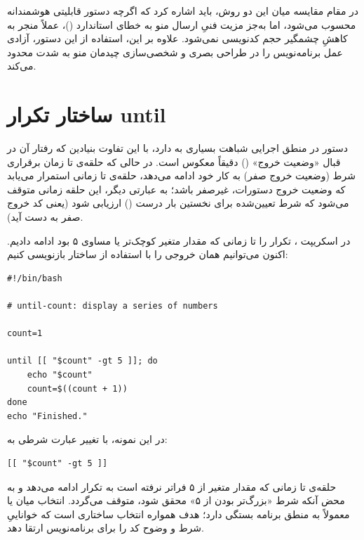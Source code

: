 در مقام مقایسه میان این دو روش، باید اشاره کرد که اگرچه دستور  قابلیتی هوشمندانه محسوب می‌شود، اما به‌جز مزیت فنیِ ارسال منو به خطای استاندارد ()، عملاً منجر به کاهشِ چشمگیر حجم کدنویسی نمی‌شود. علاوه بر این، استفاده از این دستور، آزادی عمل برنامه‌نویس را در طراحی بصری و شخصی‌سازی چیدمان منو به شدت محدود می‌کند.

\section{ساختار تکرار until}

دستور  در منطق اجرایی شباهت بسیاری به  دارد، با این تفاوت بنیادین که رفتار آن در قبال «وضعیت خروج» () دقیقاً معکوس است. در حالی که حلقه‌ی  تا زمان برقراری شرط (وضعیت خروج صفر) به کار خود ادامه می‌دهد، حلقه‌ی  تا زمانی استمرار می‌یابد که وضعیت خروج دستورات، غیرصفر باشد؛ به عبارتی دیگر، این حلقه زمانی متوقف می‌شود که شرط تعیین‌شده برای نخستین بار درست () ارزیابی شود (یعنی کد خروج صفر به دست آید).

در اسکریپت ، تکرار را تا زمانی که مقدار متغیر  کوچک‌تر یا مساوی ۵ بود ادامه دادیم. اکنون می‌توانیم همان خروجی را با استفاده از ساختار  بازنویسی کنیم:

\begin{latin}
\begin{lstlisting}
#!/bin/bash

# until-count: display a series of numbers

count=1

until [[ "$count" -gt 5 ]]; do
    echo "$count"
    count=$((count + 1))
done
echo "Finished."
\end{lstlisting}
\end{latin}

در این نمونه، با تغییر عبارت شرطی به:

\begin{latin}
\begin{lstlisting}
[[ "$count" -gt 5 ]]
\end{lstlisting}
\end{latin}

حلقه‌ی  تا زمانی که مقدار متغیر از ۵ فراتر نرفته است به تکرار ادامه می‌دهد و به محض آنکه شرط «بزرگ‌تر بودن از ۵» محقق شود، متوقف می‌گردد. انتخاب میان  یا  معمولاً به منطق برنامه بستگی دارد؛ هدف همواره انتخاب ساختاری است که خواناییِ شرط و وضوح کد را برای برنامه‌نویس ارتقا دهد.

